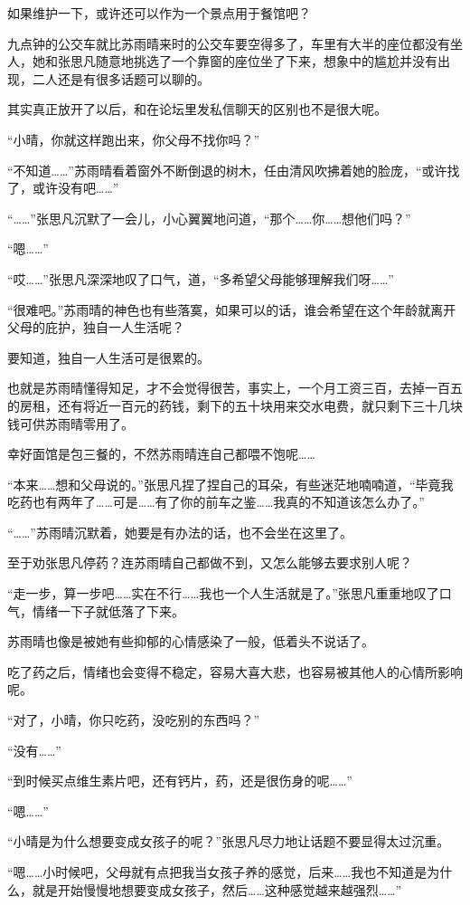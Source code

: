 如果维护一下，或许还可以作为一个景点用于餐馆吧？

九点钟的公交车就比苏雨晴来时的公交车要空得多了，车里有大半的座位都没有坐人，她和张思凡随意地挑选了一个靠窗的座位坐了下来，想象中的尴尬并没有出现，二人还是有很多话题可以聊的。

其实真正放开了以后，和在论坛里发私信聊天的区别也不是很大呢。

“小晴，你就这样跑出来，你父母不找你吗？”

“不知道……”苏雨晴看着窗外不断倒退的树木，任由清风吹拂着她的脸庞，“或许找了，或许没有吧……”

“……”张思凡沉默了一会儿，小心翼翼地问道，“那个……你……想他们吗？”

“嗯……”

“哎……”张思凡深深地叹了口气，道，“多希望父母能够理解我们呀……”

“很难吧。”苏雨晴的神色也有些落寞，如果可以的话，谁会希望在这个年龄就离开父母的庇护，独自一人生活呢？

要知道，独自一人生活可是很累的。

也就是苏雨晴懂得知足，才不会觉得很苦，事实上，一个月工资三百，去掉一百五的房租，还有将近一百元的药钱，剩下的五十块用来交水电费，就只剩下三十几块钱可供苏雨晴零用了。

幸好面馆是包三餐的，不然苏雨晴连自己都喂不饱呢……

“本来……想和父母说的。”张思凡捏了捏自己的耳朵，有些迷茫地喃喃道，“毕竟我吃药也有两年了……可是……有了你的前车之鉴……我真的不知道该怎么办了。”

“……”苏雨晴沉默着，她要是有办法的话，也不会坐在这里了。

至于劝张思凡停药？连苏雨晴自己都做不到，又怎么能够去要求别人呢？

“走一步，算一步吧……实在不行……我也一个人生活就是了。”张思凡重重地叹了口气，情绪一下子就低落了下来。

苏雨晴也像是被她有些抑郁的心情感染了一般，低着头不说话了。

吃了药之后，情绪也会变得不稳定，容易大喜大悲，也容易被其他人的心情所影响呢。

“对了，小晴，你只吃药，没吃别的东西吗？”

“没有……”

“到时候买点维生素片吧，还有钙片，药，还是很伤身的呢……”

“嗯……”

“小晴是为什么想要变成女孩子的呢？”张思凡尽力地让话题不要显得太过沉重。

“嗯……小时候吧，父母就有点把我当女孩子养的感觉，后来……我也不知道是为什么，就是开始慢慢地想要变成女孩子，然后……这种感觉越来越强烈……”

